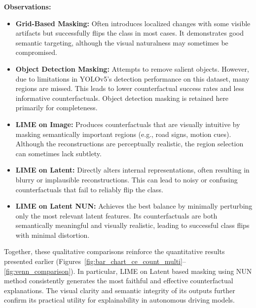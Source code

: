 \textbf{Observations:}
\begin{itemize}
    \item \textbf{Grid-Based Masking:} Often introduces localized changes with some visible artifacts but successfully flips the class in most cases. It demonstrates good semantic targeting, although the visual naturalness may sometimes be compromised.
    \item \textbf{Object Detection Masking:} Attempts to remove salient objects. However, due to limitations in YOLOv5's detection performance on this dataset, many regions are missed. This leads to lower counterfactual success rates and less informative counterfactuals. Object detection masking is retained here primarily for completeness.
    \item \textbf{LIME on Image:} Produces counterfactuals that are visually intuitive by masking semantically important regions (e.g., road signs, motion cues). Although the reconstructions are perceptually realistic, the region selection can sometimes lack subtlety.
    \item \textbf{LIME on Latent:} Directly alters internal representations, often resulting in blurry or implausible reconstructions. This can lead to noisy or confusing counterfactuals that fail to reliably flip the class.
    \item \textbf{LIME on Latent NUN:} Achieves the best balance by minimally perturbing only the most relevant latent features. Its counterfactuals are both semantically meaningful and visually realistic, leading to successful class flips with minimal distortion.
\end{itemize}

\vspace{1em}

Together, these qualitative comparisons reinforce the quantitative results presented earlier (Figures~\ref{fig:bar_chart_ce_count_multi}--\ref{fig:venn_comparison}). In particular, LIME on Latent based masking using NUN method consistently generates the most faithful and effective counterfactual explanations. The visual clarity and semantic integrity of its outputs further confirm its practical utility for explainability in autonomous driving models.


